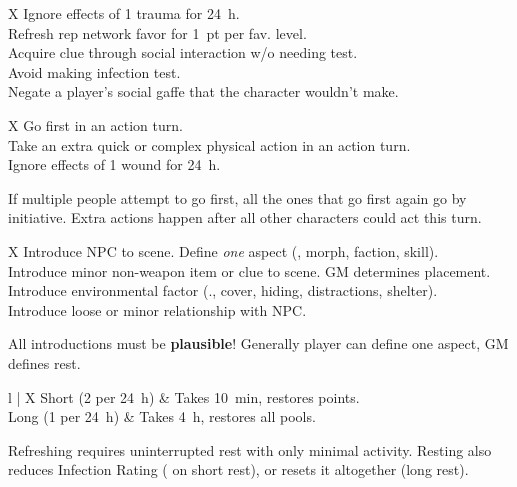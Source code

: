 \bigskip



\begin{eptable}{ X }
   Ignore effects of \num{1} trauma for \SI{24}{h}.\\
   Refresh rep network favor for \SI{1}{pt} per fav. level.\\
   Acquire clue through social interaction w/o needing test.\\
   Avoid making infection test.\\
   Negate a player’s social gaffe that the character wouldn’t make.\\
\end{eptable}

\bigskip



\begin{eptable}{ X }
   Go first in an action turn.\\
   Take an extra quick or complex physical action in an action turn.\\
   Ignore effects of \num{1} wound for \SI{24}{h}.\\
\end{eptable}

If multiple people attempt to go first, all the ones that go first
again go by initiative. Extra actions happen after all other characters
could act this turn.

\bigskip



\begin{eptable}{ X }
   Introduce NPC to scene. Define \textit{one} aspect (\eg, morph, faction, skill).\\
   Introduce minor non-weapon item or clue to scene. GM determines placement.\\
   Introduce environmental factor (\eg., cover, hiding, distractions, shelter).\\
   Introduce loose or minor relationship with NPC.\\
\end{eptable}

All introductions must be \textbf{plausible}! Generally player
can define one aspect, GM defines rest.

\bigskip


\begin{eptable}{ l | X }
   Short (2 per \SI{24}{h}) & Takes \SI{10}{min}, restores  points.\\
   Long (1 per \SI{24}{h}) & Takes \SI{4}{h}, restores all pools.\\
\end{eptable}

\begin{itemize}
    \itembox Refreshing requires uninterrupted rest with only minimal activity.
    \itembox Resting also reduces Infection Rating ( on short rest), or resets it altogether (long rest).
\end{itemize}
